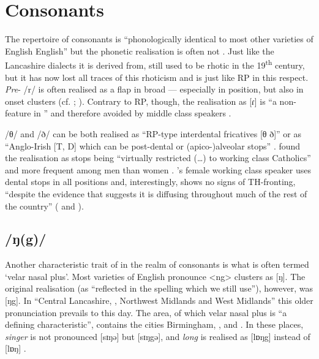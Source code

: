 	\section{Consonants}\label{sec.var.con}

The repertoire of  consonants is ``phonologically identical to most other varieties of English English'' but the phonetic realisation is often not \citep[351]{watson2007}.
Just like the Lancashire dialects it is derived from,  still used to be rhotic in the 19\textsuperscript{th} century, but it has now lost all traces of this rhoticism \citep[cf.][149]{knowles1997} and is just like RP in this respect.
\emph{Pre}- /r/ is often realised as a flap in broad  --- especially in  position, but also in onset clusters (cf. \citealt[107 and 329--330]{knowles1973}; \citealt[352]{watson2007}).
Contrary to RP, though, the realisation as [ɾ] is ``a non- feature in '' and therefore avoided by middle class speakers \citep[329]{knowles1973}.

/θ/ and /ð/ can be both realised as ``RP-type interdental fricatives [θ ð]'' or as ``Anglo-Irish [T, D] which can be post-dental or (apico-)alveolar stops'' \citep[323]{knowles1973}.
\citeauthor{knowles1973} found the realisation as stops being ``virtually restricted (\ldots) to working class Catholics'' and more frequent among men than women \citep[323--324]{knowles1973}.
\citeauthor{watson2007}'s \citeyearpar{watson2007} female working class speaker uses dental stops in all positions and, interestingly, shows no signs of TH-fronting, ``despite the evidence that suggests it is diffusing throughout much of the rest of the country'' (\citealp[cf.][352]{watson2007} and \citeyear[227--228]{watson2007a}).

		\subsection{/ŋ(g)/}\label{sec.var.con.ng}

Another characteristic trait of  in the realm of consonants is what is often termed `velar nasal plus'.
Most varieties of English pronounce  <ng> clusters as [ŋ].
The original realisation (as ``reflected in the spelling which we still use''), however, was [ŋg]. In ``Central Lancashire, , Northwest Midlands and West Midlands'' this older pronunciation prevails to this day. 
The area, of which velar nasal plus is ``a defining characteristic'', contains the cities Birmingham, , and .
In these places, \emph{singer} is not pronounced [sɪŋə] but [sɪŋgə], and \emph{long} is realised as [lɒŋg] instead of [lɒŋ] \citep[cf.][58]{trudgill1999}.

